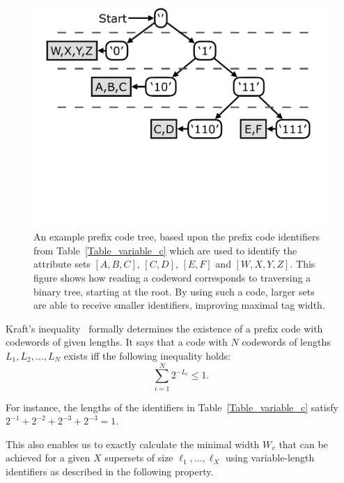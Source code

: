 \begin{figure}[t!] 
\begin{minipage}{1\linewidth}
\includegraphics[trim={0 10cm 0 0}, clip, width=\linewidth]{figures/code_tree}
\end{minipage} 
\caption{An example prefix code tree, based upon the prefix code identifiers from Table~\ref{Table_variable_c} which are used to identify the attribute sets $[A,B,C]$, $[C,D]$, $[E,F]$ and $[W,X,Y,Z]$. This figure shows how reading a codeword corresponds to traversing a binary tree, starting at the root. By using such a code, larger sets are able to receive smaller identifiers, improving maximal  tag width.}
\label{fig:code_tree}
\end{figure}


Kraft's inequality~\cite{abramson} formally determines the existence of a prefix code with codewords of given lengths. It says that a code with $N$ codewords of lengths 
 $L_1, L_2, \ldots, L_N$ exists 
iff the following inequality holds:
$$ \sum_{i = 1}^{N}{2^{-L_i}} \le 1. $$

For instance, the lengths of the identifiers in Table~\ref{Table_variable_c} satisfy $2^{-1} + 2^{-2} + 2^{-3} + 2^{-3} = 1$.

This also enables us to exactly calculate the minimal width $W_{v}$ that can be achieved for a given $X$ supersets of size $\ell_1, \ldots, \ell_X$  using variable-length identifiers as described in the following property.

